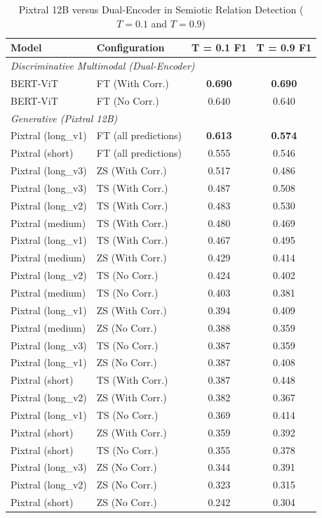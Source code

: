 \begin{table}[!t]
\centering
\caption{Pixtral 12B versus Dual-Encoder in Semiotic Relation Detection ($T=0.1$ and $T=0.9$)}
\label{tab:relation_pixtral}
\footnotesize
\renewcommand{\arraystretch}{0.90}
\begin{tabular}{l l c c}
\hline
\textbf{Model} & \textbf{Configuration} & \textbf{T = 0.1 F1} & \textbf{T = 0.9 F1} \\
\hline
\multicolumn{4}{l}{\textit{Discriminative Multimodal (Dual-Encoder)}} \\
BERT-ViT & FT (With Corr.) & \textbf{0.690} & \textbf{0.690} \\
BERT-ViT & FT (No Corr.)  & 0.640 & 0.640 \\
\hline
\multicolumn{4}{l}{\textit{Generative (Pixtral 12B)}} \\
Pixtral (long\_v1) & FT (all predictions) & \textbf{0.613} & \textbf{0.574} \\
Pixtral (short) & FT (all predictions) & 0.555 & 0.546 \\
Pixtral (long\_v3) & ZS (With Corr.) & 0.517 & 0.486 \\
Pixtral (long\_v3) & TS (With Corr.) & 0.487 & 0.508 \\
Pixtral (long\_v2) & TS (With Corr.) & 0.483 & 0.530 \\
Pixtral (medium) & TS (With Corr.) & 0.480 & 0.469 \\
Pixtral (long\_v1) & TS (With Corr.) & 0.467 & 0.495 \\
Pixtral (medium) & ZS (With Corr.) & 0.429 & 0.414 \\
Pixtral (long\_v2) & TS (No Corr.) & 0.424 & 0.402 \\
Pixtral (medium) & TS (No Corr.) & 0.403 & 0.381 \\
Pixtral (long\_v1) & ZS (With Corr.) & 0.394 & 0.409 \\
Pixtral (medium) & ZS (No Corr.) & 0.388 & 0.359 \\
Pixtral (long\_v3) & TS (No Corr.) & 0.387 & 0.359 \\
Pixtral (long\_v1) & ZS (No Corr.) & 0.387 & 0.408 \\
Pixtral (short) & TS (With Corr.) & 0.387 & 0.448 \\
Pixtral (long\_v2) & ZS (With Corr.) & 0.382 & 0.367 \\
Pixtral (long\_v1) & TS (No Corr.) & 0.369 & 0.414 \\
Pixtral (short) & ZS (With Corr.) & 0.359 & 0.392 \\
Pixtral (short) & TS (No Corr.) & 0.355 & 0.378 \\
Pixtral (long\_v3) & ZS (No Corr.) & 0.344 & 0.391 \\
Pixtral (long\_v2) & ZS (No Corr.) & 0.323 & 0.315 \\
Pixtral (short) & ZS (No Corr.) & 0.242 & 0.304 \\
\hline
\end{tabular}
\end{table}

